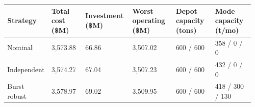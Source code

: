 \begin{tabular}{llllll}
\toprule
Strategy & Total cost (\$M) & Investment (\$M) & Worst operating (\$M) & Depot capacity (tons) & Mode capacity (t/mo) \\
\midrule
Nominal & 3,573.88 & 66.86 & 3,507.02 & 600 / 600 & 358 / 0 / 0 \\
Independent & 3,574.27 & 67.04 & 3,507.23 & 600 / 600 & 432 / 0 / 0 \\
Burst robust & 3,578.97 & 69.02 & 3,509.95 & 600 / 600 & 418 / 300 / 130 \\
\bottomrule
\end{tabular}
